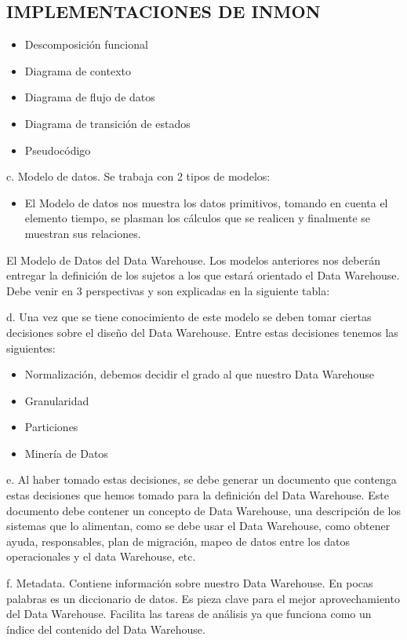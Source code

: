 \documentclass[%
 reprint,
 amsmath,amssymb,
 aps,
]{revtex4-1}
\begin{document}

\subsection{IMPLEMENTACIONES DE  INMON}
\begin{itemize}
	\item Descomposición funcional
	\item Diagrama de contexto
	\item Diagrama de flujo de datos
	\item Diagrama de transición de estados
	\item Pseudocódigo
\end{itemize}

	c. Modelo de datos. Se trabaja con 2 tipos de modelos:
		\begin{itemize}
			\item El Modelo de datos nos muestra los datos primitivos, tomando en cuenta el elemento tiempo, se plasman los cálculos que se realicen y finalmente se muestran sus relaciones.
		\end{itemize}

El Modelo de Datos del Data Warehouse. Los modelos anteriores nos deberán entregar la definición de los sujetos a los que estará orientado el Data Warehouse. Debe venir en 3 perspectivas y son explicadas en la siguiente tabla:


	d. Una vez que se tiene conocimiento de este modelo se deben tomar ciertas decisiones sobre el diseño del Data Warehouse. Entre estas decisiones tenemos las siguientes:
		\begin{itemize}
			\item Normalización, debemos decidir el grado al que nuestro Data Warehouse
			\item Granularidad
			\item Particiones
			\item  Minería de Datos
		\end{itemize}

	e. Al haber tomado estas decisiones, se debe generar un documento que contenga estas decisiones que hemos tomado para la definición del Data Warehouse. Este documento debe contener un concepto de Data Warehouse, una descripción de los sistemas que lo alimentan, como se debe usar el Data Warehouse, como obtener ayuda, responsables, plan de migración, mapeo de datos entre los datos operacionales y el data Warehouse, etc.

	f. Metadata. Contiene información sobre nuestro Data Warehouse. En pocas palabras es un diccionario de datos. Es pieza clave para el mejor aprovechamiento del Data Warehouse. Facilita las tareas de análisis ya que funciona como un índice del contenido del Data Warehouse.
\end{document}
